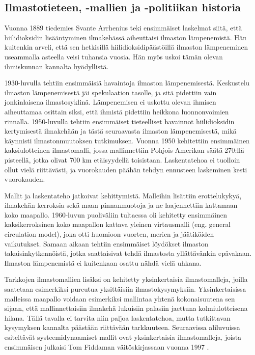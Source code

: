 \documentclass[finnish,12pt,a4paper,pdftex]{article}
\begin{document}
\begin{onehalfspacing}
\subsection{Ilmastotieteen, -mallien ja -politiikan historia \label{ilmasto:historia}}

Vuonna 1889 tiedemies Svante Arrhenius teki ensimmäiset laskelmat siitä, että hiilidioksidin lisääntyminen ilmakehässä aiheuttaisi ilmaston lämpenemistä. Hän kuitenkin arveli, että sen hetkisillä hiilidioksidipäästöillä ilmaston lämpeneminen useammalla asteella veisi tuhansia vuosia. Hän myös uskoi tämän olevan ihmiskunnan kannalta hyödyllistä. \cite{AmericanInstituteofPhysicsSimple}

1930-luvulla tehtiin ensimmäisiä havaintoja ilmaston lämpenemisestä. Keskustelu ilmaston lämpenemisestä jäi spekulaation tasolle, ja sitä pidettiin vain jonkinlaisena ilmastosyklinä. Lämpenemisen ei uskottu olevan ihmisen aiheuttamaa osittain siksi, että ihmistä pidettiin heikkona luonnonvoimien rinnalla. 1950-luvulla tehtiin ensimmäiset tieteelliset havainnot hiilidioksidin kertymisestä ilmakehään ja tästä seuraavasta ilmaston lämpenemisestä, mikä käynnisti ilmastonmuutoksen tutkimuksen. \cite{AmericanInstituteofPhysics} Vuonna 1950 kehitettiin ensimmäinen kaksiulotteinen ilmastomalli, jossa mallinnettiin Pohjois-Amerikan säätä 270:llä pisteellä, jotka olivat 700 km etäisyydellä toisistaan. Laskentatehoa ei tuolloin ollut vielä riittävästi, ja vuorokauden päähän tehdyn ennusteen laskeminen kesti vuorokauden. \cite{AmericanInstituteofPhysicsGCM}

Mallit ja laskentateho jatkoivat kehittymistä. Malleihin lisättiin erottelukykyä, ilmakehän kerroksia sekä maan pinnanmuotoja ja ne laajennettiin kattamaan koko maapallo. 1960-luvun puoliväliin tultaessa oli kehitetty ensimmäinen kaksikerroksinen koko maapallon kattava yleinen virtausmalli (eng. general circulation model), joka otti huomioon vuorten, merien ja jäätiköiden vaikutukset. \cite{AmericanInstituteofPhysicsGCM} Samaan aikaan tehtiin ensimmäiset löydökset ilmaston takaisinkytkennöistä, jotka saattaisivat tehdä ilmastosta yllättävänkin epävakaan. Ilmaston lämpenemistä ei kuitenkaan osattu nähdä vielä uhkana. \cite{AmericanInstituteofPhysics} 

Tarkkojen ilmastomallien lisäksi on kehitetty yksinkertaisia ilmastomalleja, joilla saatetaan esimerkiksi pureutua yksittäisiin ilmastokysymyksiin. Yksinkertaisissa malleissa maapallo voidaan esimerkiksi mallintaa yhtenä kokonaisuutena sen sijaan, että mallinnettaisiin ilmakehä lukuisiin palasiin jaettuna kolmiulotteisena hilana. Tällä tavalla ei tarvita niin paljoa laskentatehoa, mutta tutkittavan kysymyksen kannalta päästään riittävään tarkkuuteen. \cite{AmericanInstituteofPhysicsSimple} Seuraavissa aliluvuissa esiteltävät systeemidynaamiset mallit ovat yksinkertaisia ilmastomalleja, joista ensimmäisen julkaisi Tom Fiddaman väitöskirjassaan vuonna 1997 \cite{Fiddaman1997}. 


\end{onehalfspacing}
\end{document}
